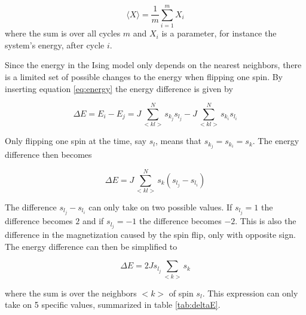 \documentclass{article}
\begin{document}
\begin{equation}
\langle X \rangle = \frac{1}{m}\sum\limits_{i=1}^{m} X_{i}
\end{equation}
where the sum is over all cycles ${m}$ and $X_i$ is a parameter, for instance the system's energy, after cycle $i$. 

Since the energy in the Ising model only depends on the nearest neighbors, there is a limited set of possible changes to the energy when flipping one spin. By inserting equation \ref{eq:energy} the energy difference is given by

\begin{equation}
\Delta E = E_i - E_j = J\sum\limits_{<kl>}^N s_{k_j} s_{l_j} - J\sum\limits_{<kl>}^N s_{k_i} s_{l_i}
\end{equation}

Only flipping one spin at the time, say $s_l$, means that $s_{k_j}=s_{k_i}=s_k$. The energy difference then becomes

\begin{equation}
\Delta E = J\sum\limits_{<kl>}^N s_k(s_{l_j} - s_{l_i})
\end{equation}

The difference $s_{l_j} - s_{l_i}$ can only take on two possible values. If $s_{l_j}=1$ the difference becomes $2$ and if $s_{l_j}=-1$ the difference becomes $-2$. This is also the difference in the magnetization caused by the spin flip, only with opposite sign. The energy difference can then be simplified to

\begin{equation}
\Delta E = 2Js_{l_j} \sum\limits_{<k>} s_k
\end{equation}

where the sum is over the neighbors $<k>$ of spin $s_l$. This expression can only take on 5 specific values, summarized in table \ref{tab:deltaE}. 
\end{document}
